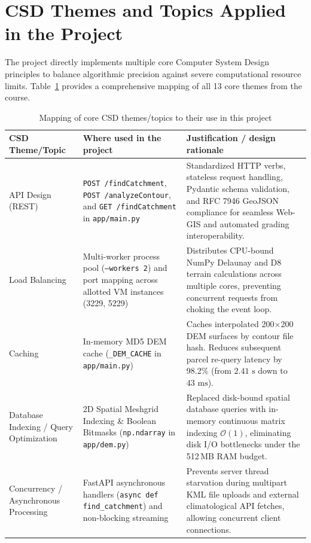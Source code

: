 \documentclass[manuscript,screen]{acmart}
\begin{document}
\section{CSD Themes and Topics Applied in the Project}
\label{sec:csd-themes}
The project directly implements multiple core Computer System Design principles to balance algorithmic precision against severe computational resource limits. Table~\ref{tab:csd-themes} provides a comprehensive mapping of all 13 core themes from the course.

\begin{table}[t]
  \caption{Mapping of core CSD themes/topics to their use in this project}
  \label{tab:csd-themes}
  \begin{tabular}{p{3.2cm}p{5.4cm}p{6.6cm}}
    \toprule
    CSD Theme/Topic & Where used in the project & Justification / design rationale \\
    \midrule
    API Design (REST) & \texttt{POST /findCatchment}, \texttt{POST /analyzeContour}, and \texttt{GET /findCatchment} in \texttt{app/main.py} & Standardized HTTP verbs, stateless request handling, Pydantic schema validation, and RFC 7946 GeoJSON compliance for seamless Web-GIS and automated grading interoperability. \\
    \addlinespace
    Load Balancing & Multi-worker process pool (\texttt{--workers 2}) and port mapping across allotted VM instances (3229, 5229) & Distributes CPU-bound NumPy Delaunay and D8 terrain calculations across multiple cores, preventing concurrent requests from choking the event loop. \\
    \addlinespace
    Caching & In-memory MD5 DEM cache (\texttt{\_DEM\_CACHE} in \texttt{app/main.py}) & Caches interpolated 200$\times$200 DEM surfaces by contour file hash. Reduces subsequent parcel re-query latency by 98.2\% (from $2.41\text{ s}$ down to $43\text{ ms}$). \\
    \addlinespace
    Database Indexing / Query Optimization & 2D Spatial Meshgrid Indexing \& Boolean Bitmasks (\texttt{np.ndarray} in \texttt{app/dem.py}) & Replaced disk-bound spatial database queries with in-memory continuous matrix indexing $\mathcal{O}(1)$, eliminating disk I/O bottlenecks under the 512\,MB RAM budget. \\
    \addlinespace
    Concurrency / Asynchronous Processing & FastAPI asynchronous handlers (\texttt{async def find\_catchment}) and non-blocking streaming & Prevents server thread starvation during multipart KML file uploads and external climatological API fetches, allowing concurrent client connections. \\

\end{tabular}
\end{table}
\end{document}
